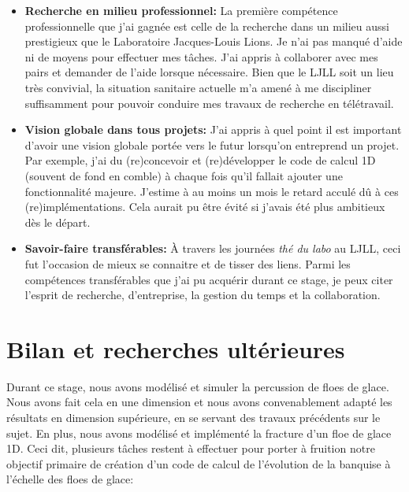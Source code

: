 \begin{itemize}
    \item \textbf{Recherche en milieu professionnel:} La première compétence professionnelle que j'ai gagnée est celle de la recherche dans un milieu aussi prestigieux que le Laboratoire Jacques-Louis Lions. Je n'ai pas manqué d'aide ni de moyens pour effectuer mes tâches. J'ai appris à collaborer avec mes pairs et demander de l'aide lorsque nécessaire. Bien que le LJLL soit un lieu très convivial, la situation sanitaire actuelle m'a amené à me discipliner suffisamment pour pouvoir conduire mes travaux de recherche en télétravail.
    \item \textbf{Vision globale dans tous projets:} J'ai appris à quel point il est important d'avoir une vision globale portée vers le futur lorsqu'on entreprend un projet. Par exemple, j'ai du (re)concevoir et (re)développer le code de calcul 1D (souvent de fond en comble) à chaque fois qu'il fallait ajouter une fonctionnalité majeure. J'estime à au moins un mois le retard acculé dû à ces (re)implémentations. Cela aurait pu être évité si j'avais été plus ambitieux dès le départ.
    \item \textbf{Savoir-faire transférables:} À travers les journées \emph{thé du labo} au LJLL, ceci fut l'occasion de mieux se connaitre et de tisser des liens. Parmi les compétences transférables que j'ai pu acquérir durant ce stage, je peux citer l'esprit de recherche, d'entreprise, la gestion du temps et la collaboration.
\end{itemize}










\section{Bilan et recherches ultérieures}

Durant ce stage, nous avons modélisé et simuler la percussion de floes de glace. Nous avons fait cela en une dimension et nous avons convenablement adapté les résultats en dimension supérieure, en se servant des travaux précédents sur le sujet. En plus, nous avons modélisé et implémenté la fracture d'un floe de glace 1D. Ceci dit, plusieurs tâches restent à effectuer pour porter à fruition notre objectif primaire de création d'un code de calcul de l’évolution de la banquise à l’échelle des floes de glace:

